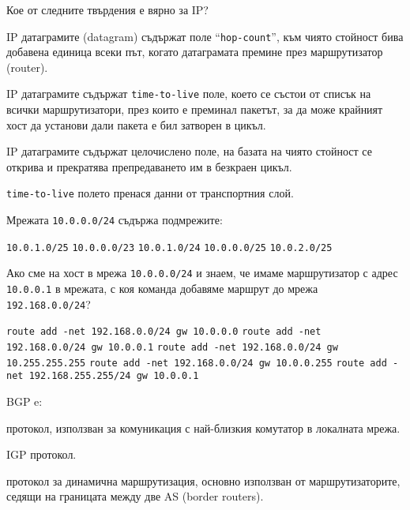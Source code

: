 \begin{questions}
  \question[6] Кое от следните твърдения е вярно за IP?
  \begin{choices}
    \choice IP датаграмите (\foreignlanguage{english}{datagram}) съдържат поле
    "`\texttt{\foreignlanguage{english}{hop-count}}"', към чиято стойност бива
    добавена единица всеки път, когато датаграмата премине през маршрутизатор
    (\foreignlanguage{english}{router}).

    \choice IP датаграмите съдържат
    \texttt{\foreignlanguage{english}{time-to-live}} поле, което се състои от
    списък на всички маршрутизатори, през които е преминал пакетът, за да може
    крайният хост да установи дали пакета е бил затворен в цикъл.

    \CorrectChoice IP датаграмите съдържат целочислено поле, на базата на чиято
    стойност се открива и прекратява препредаването им в безкраен цикъл.

    \choice \texttt{\foreignlanguage{english}{time-to-live}} полето пренася
    данни от транспортния слой.
  \end{choices}

  \question[10] Мрежата \texttt{10.0.0.0/24} съдържа подмрежите:
  \begin{oneparchoices}
    \choice \texttt{10.0.1.0/25}
    \choice \texttt{10.0.0.0/23}
    \choice \texttt{10.0.1.0/24}
    \CorrectChoice \texttt{10.0.0.0/25}
    \choice \texttt{10.0.2.0/25}
  \end{oneparchoices}

  \question[6] Ако сме на хост в мрежа \texttt{10.0.0.0/24} и знаем, че имаме
  маршрутизатор с адрес \texttt{10.0.0.1} в мрежата, с коя команда добавяме
  маршрут до мрежа \texttt{192.168.0.0/24}?
  \begin{choices}
    \choice \texttt{route add -net 192.168.0.0/24 gw 10.0.0.0}
    \CorrectChoice \texttt{route add -net 192.168.0.0/24 gw 10.0.0.1}
    \choice \texttt{route add -net 192.168.0.0/24 gw 10.255.255.255}
    \choice \texttt{route add -net 192.168.0.0/24 gw 10.0.0.255}
    \choice \texttt{route add -net 192.168.255.255/24 gw 10.0.0.1}
  \end{choices}

  \question[6] BGP e:
  \begin{choices}
    \choice протокол, използван за комуникация с най-близкия комутатор в
    локалната мрежа.

    \choice IGP протокол.

    \CorrectChoice протокол за динамична маршрутизация, основно използван от
    маршрутизаторите, седящи на границата между две AS
    (\foreignlanguage{english}{border routers}).


\end{choices}
\end{questions}
